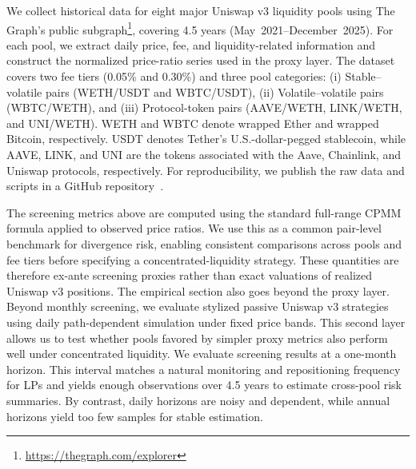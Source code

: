 \documentclass[10pt,conference,compsocconf]{IEEEtran}
\begin{document}
We collect historical data for eight major Uniswap v3 liquidity pools using The Graph's public subgraph\footnote{\url{https://thegraph.com/explorer}}, covering 4.5 years (May~2021--December~2025). For each pool, we extract daily price, fee, and liquidity-related information and construct the normalized price-ratio series used in the proxy layer. The dataset covers two fee tiers (0.05\% and 0.30\%) and three pool categories: (i) Stable--volatile pairs (WETH/USDT and WBTC/USDT), (ii) Volatile--volatile pairs (WBTC/WETH), and (iii) Protocol-token pairs (AAVE/WETH, LINK/WETH, and UNI/WETH). WETH and WBTC denote wrapped Ether and wrapped Bitcoin, respectively. USDT denotes Tether's U.S.-dollar-pegged stablecoin, while AAVE, LINK, and UNI are the tokens associated with the Aave, Chainlink, and Uniswap protocols, respectively.
For reproducibility, we publish the raw data and scripts in a GitHub repository~\cite{mitigation_code}.


The screening metrics above are computed using the standard full-range CPMM formula applied to observed price ratios. We use this as a common pair-level benchmark for divergence risk, enabling consistent comparisons across pools and fee tiers before specifying a concentrated-liquidity strategy. These quantities are therefore ex-ante screening proxies rather than exact valuations of realized Uniswap v3 positions.
The empirical section also goes beyond the proxy layer. Beyond monthly screening, we evaluate stylized passive Uniswap v3 strategies using daily path-dependent simulation under fixed price bands. This second layer allows us to test whether pools favored by simpler proxy metrics also perform well under concentrated liquidity.
We evaluate screening results at a one-month horizon. This interval matches a natural monitoring and repositioning frequency for LPs and yields enough observations over 4.5 years to estimate cross-pool risk summaries. By contrast, daily horizons are noisy and dependent, while annual horizons yield too few samples for stable estimation.



%     

%         
\end{document}
